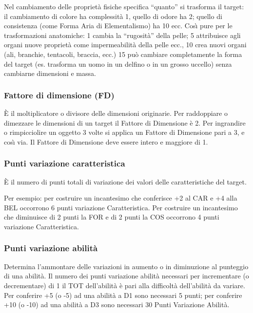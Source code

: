 Nel cambiamento delle propriet\`a fisiche specifica ``quanto'' si
trasforma il target: il cambiamento di colore ha complessit\`a 1,
quello di odore ha 2; quello di consistenza (come Forma Aria di
Elementalismo) ha 10 ecc.  Cos\`{\i} pure per le trasformazioni
anatomiche: 1 cambia la ``rugosit\`a'' della pelle; 5 attribuisce
agli organi nuove propriet\`a come impermeabilit\`a della pelle
ecc., 10 crea nuovi organi (ali, branchie, tentacoli, braccia,
ecc.) 15 pu\`o cambiare completamente la forma del target (es.
trasforma un uomo in un delfino o in un grosso uccello) senza
cambiarne dimensioni e massa.

\subsubsection{Fattore di dimensione (FD)}
\`E il moltiplicatore o divisore delle dimensioni originarie. Per
raddoppiare o dimezzare le dimensioni di un target il Fattore di
Dimensione \`e 2. Per ingrandire o rimpicciolire un oggetto 3 volte
si applica un Fattore di Dimensione pari a 3, e cos\`{\i} via. Il
Fattore di Dimensione deve essere intero e maggiore di 1.

\iffullversion
\subsubsection{Punti variazione caratteristica} 

\`E il numero di punti totali di variazione dei valori delle
caratteristiche del target.

Per esempio: per costruire un incantesimo che conferisce +2 al CAR e
+4 alla BEL occorrono 6 punti variazione Caratteristica. Per costruire
un incantesimo che diminuisce di 2 punti la FOR e di 2 punti la COS
occorrono 4 punti variazione Caratteristica.
\fi

\subsubsection{Punti variazione abilit\`a}

Determina l'ammontare delle variazioni in aumento o in diminuzione al
punteggio di una abilit\`a.  Il numero dei punti variazione
abilit\`a necessari per incrementare (o decrementare) di 1 il TOT
dell'abilit\`a \`e pari alla difficolt\`a dell'abilit\`a da
variare. Per conferire +5 (o -5) ad una abilit\`a a D1 sono
necessari 5 punti; per conferire +10 (o -10) ad una abilit\`a a D3
sono necessari 30 Punti Variazione Abilit\`a. 

